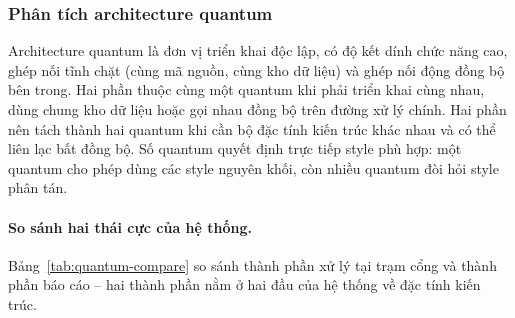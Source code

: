 \subsubsection{Phân tích architecture quantum}\label{sec:quantum}
Architecture quantum là đơn vị triển khai độc lập, có độ kết dính chức năng cao, ghép nối tĩnh chặt (cùng mã nguồn, cùng kho dữ liệu) và ghép nối động đồng bộ bên trong. Hai phần thuộc cùng một quantum khi phải triển khai cùng nhau, dùng chung kho dữ liệu hoặc gọi nhau đồng bộ trên đường xử lý chính. Hai phần nên tách thành hai quantum khi cần bộ đặc tính kiến trúc khác nhau và có thể liên lạc bất đồng bộ. Số quantum quyết định trực tiếp style phù hợp: một quantum cho phép dùng các style nguyên khối, còn nhiều quantum đòi hỏi style phân tán.

\paragraph{So sánh hai thái cực của hệ thống.} Bảng~\ref{tab:quantum-compare} so sánh thành phần xử lý tại trạm cổng và thành phần báo cáo -- hai thành phần nằm ở hai đầu của hệ thống về đặc tính kiến trúc.

